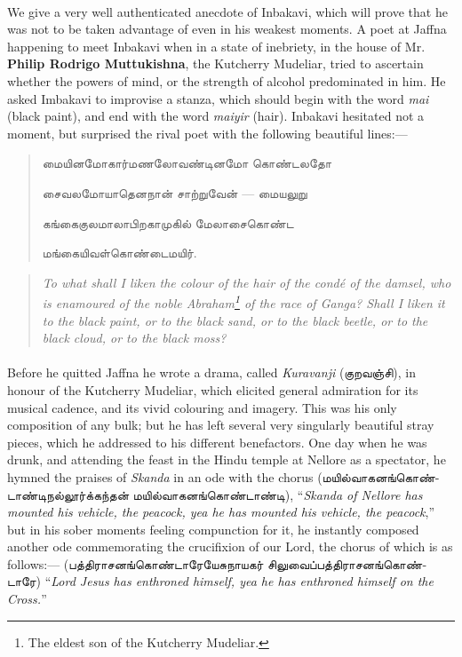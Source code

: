 \documentclass{article}
\newcommand{\TamilText}[1]{\texttamil{#1}}
\newcommand{\tam}[1]{\TamilText{#1}}
\begin{document}
\paragraph{}
We give a very well authenticated anecdote of Inbakavi, which will prove that he was not to be taken advantage of even in his weakest moments. A poet at Jaffna happening to meet Inbakavi when in a state of inebriety, in the house of Mr. \textbf{Philip Rodrigo Muttukishna}, the Kutcherry Mudeliar, tried to ascertain whether the powers of mind, or the strength of alcohol predominated in him. He asked Imbakavi to improvise a stanza, which should begin with the word \emph{mai} (black paint), and end with the word \emph{maiyir} (hair). Inbakavi hesitated not a moment, but surprised the rival poet with the following beautiful lines:---
\begin{quotation}\small
\tam{மையினமோகார்மணலோவண்டினமோ கொண்டலதோ}

\tam{சைவலமோயாதெனநான்‌ சாற்றுவேன்‌} --- \tam{மையலுறு}

\tam{கங்கைகுலமாலாபிறகாமுகில்‌ மேலாசைகொண்ட}

\tam{மங்கையிவள்‌கொண்டைமயிர்}.
\end{quotation}
\begin{quotation}\small
\emph{To what shall I liken the colour of the hair of the condé of the damsel, who is enamoured of the noble Abraham\footnote{The eldest son of the Kutcherry Mudeliar.} of the race of Ganga? Shall I liken it to the black paint, or to the black sand, or to the black beetle, or to the black cloud, or to the black moss?}
\end{quotation}
\paragraph{}
Before he quitted Jaffna he wrote a drama, called \emph{Kuravanji} (\tam{குறவஞ்சி}), in honour of the Kutcherry Mudeliar, which elicited general admiration for its musical cadence, and its vivid colouring and imagery. This was his only composition of any bulk; but he has left several very singularly beautiful stray pieces, which he addressed to his different benefactors. One day when he was drunk, and attending the feast in the Hindu temple at Nellore as a spectator, he hymned the praises of \emph{Skanda} in an ode with the chorus (\tam{மயில்வாகனங்கொண்டாண்டிநல்லூர்க்கந்தன் மயில்வாகனங்கொண்டாண்டி}), ``\emph{Skanda of Nellore has mounted his vehicle, the peacock, yea he has mounted his vehicle, the peacock},'' but in his sober moments feeling compunction for it, he instantly composed another ode commemorating the crucifixion of our Lord, the chorus of which is as follows:--- (\tam{பத்திராசனங்கொண்டாரேயேசுநாயகர் சிலுவைப்பத்திராசனங்கொண்டாரே}) ``\emph{Lord Jesus has enthroned himself, yea he has enthroned himself on the Cross.}''
\end{document}
